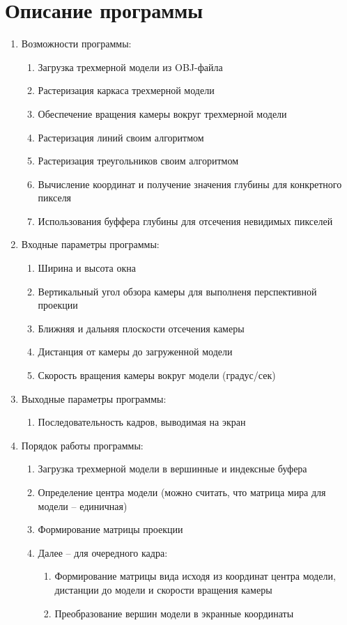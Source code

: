 \documentclass[14pt,a4paper,report]{report}
\begin{document}
\section{Описание программы}
\begin{enumerate}
\item Возможности программы:
\begin{enumerate}
\item Загрузка трехмерной модели из OBJ-файла
\item Растеризация каркаса трехмерной модели
\item Обеспечение вращения камеры вокруг трехмерной модели
\item Растеризация линий своим алгоритмом
\item Растеризация треугольников своим алгоритмом
\item Вычисление координат и получение значения глубины для конкретного пикселя
\item Использования буффера глубины для отсечения невидимых пикселей
\end{enumerate}
\item Входные параметры программы:
\begin{enumerate}
\item Ширина и высота окна
\item Вертикальный угол обзора камеры для выполненя перспективной проекции
\item Ближняя и дальняя плоскости отсечения камеры
\item Дистанция от камеры до загруженной модели
\item Скорость вращения камеры вокруг модели (градус/сек)
\end{enumerate}
\item Выходные параметры программы:
\begin{enumerate}
\item Последовательность кадров, выводимая на экран
\end{enumerate}
\item Порядок работы программы:
\begin{enumerate}
\item Загрузка трехмерной модели в вершинные и индексные буфера
\item Определение центра модели (можно считать, что матрица мира для модели – единичная)
\item Формирование матрицы проекции
\item Далее – для очередного кадра:
\begin{enumerate}
\item Формирование матрицы вида исходя из координат центра модели, дистанции до модели и скорости вращения камеры
\item Преобразование вершин модели в экранные координаты 
\end{enumerate}
\end{enumerate}
\end{enumerate}
\clearpage
\end{document}
